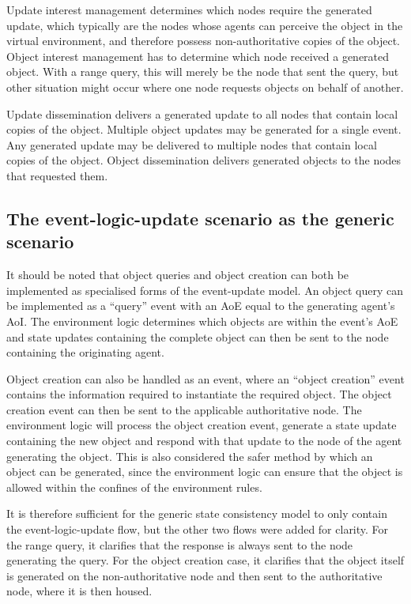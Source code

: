 Update interest management determines which nodes require the generated update, which typically are the nodes whose agents can perceive the object in the virtual environment, and therefore possess non-authoritative copies of the object. Object interest management has to determine which node received a generated object. With a range query, this will merely be the node that sent the query, but other situation might occur where one node requests objects on behalf of another.

Update dissemination delivers a generated update to all nodes that contain local copies of the object. Multiple object updates may be generated for a single event. Any generated update may be delivered to multiple nodes that contain local copies of the object. Object dissemination delivers generated objects to the nodes that requested them.

\subsection{The event-logic-update scenario as the generic scenario}

It should be noted that object queries and object creation can both be implemented as specialised forms of the event-update model. An object query can be implemented as a ``query'' event with an AoE equal to the generating agent's AoI. The environment logic determines which objects are within the event's AoE and state updates containing the complete object can then be sent to the node containing the originating agent.

Object creation can also be handled as an event, where an ``object creation'' event contains the information required to instantiate the required object. The object creation event can then be sent to the applicable authoritative node. The environment logic will process the object creation event, generate a state update containing the new object and respond with that update to the node of the agent generating the object. This is also considered the safer method by which an object can be generated, since the environment logic can ensure that the object is allowed within the confines of the environment rules.

It is therefore sufficient for the generic state consistency model to only contain the event-logic-update flow, but the other two flows were added for clarity. For the range query, it clarifies that the response is always sent to the node generating the query. For the object creation case, it clarifies that the object itself is generated on the non-authoritative node and then sent to the authoritative node, where it is then housed.

